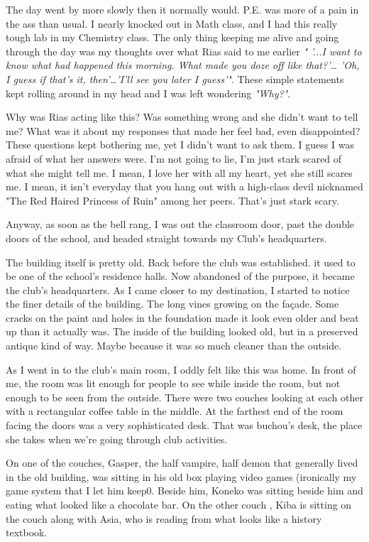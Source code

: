 \documentclass{article}
\begin{document}
The day went by more slowly then it normally would. P.E. was more of a pain in the ass than usual. I nearly knocked out in Math class, and I had this really tough lab in my Chemistry class. The only thing keeping me alive and going through the day was my thoughts over what Rias said to me earlier \emph{" '...I want to know what had happened this morning. What made you doze off like that?'… 'Oh, I guess if that's it, then'…'I'll see you later I guess'"}. These simple statements kept rolling around in my head and I was left wondering \emph{"Why?"}.

Why was Rias acting like this? Was something wrong and she didn't want to tell me? What was it about my responses that made her feel bad, even disappointed? These questions kept bothering me, yet I didn't want to ask them. I guess I was afraid of what her answers were. I'm not going to lie, I'm just stark scared of what she might tell me. I mean, I love her with all my heart, yet she still scares me. I mean, it isn't everyday that you hang out with a high-class devil nicknamed "The Red Haired Princess of Ruin" among her peers. That's just stark scary.

Anyway, as soon as the bell rang, I was out the classroom door, past the double doors of the school, and headed straight towards my Club's headquarters.

The building itself is pretty old. Back before the club was established. it used to be one of the school's residence halls. Now abandoned of the purpose, it became the club's headquarters. As I came closer to my destination, I started to notice the finer details of the building. The long vines growing on the façade. Some cracks on the paint and holes in the foundation made it look even older and beat up than it actually was. The inside of the building looked old, but in a preserved antique kind of way. Maybe because it was so much cleaner than the outside.

As I went in to the club's main room, I oddly felt like this was home. In front of me, the room was lit enough for people to see while inside the room, but not enough to be seen from the outside. There were two couches looking at each other with a rectangular coffee table in the middle. At the farthest end of the room facing the doors was a very sophisticated desk. That was buchou's desk, the place she takes when we're going through club activities.

On one of the couches, Gasper, the half vampire, half demon that generally lived in the old building, was sitting in his old box playing video games (ironically my game system that I let him keep0. Beside him, Koneko was sitting beside him and eating what looked like a chocolate bar. On the other couch , Kiba is sitting on the couch along with Asia, who is reading from what looks like a history textbook.
\end{document}
